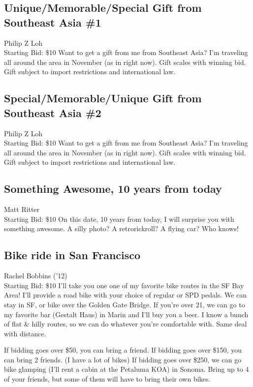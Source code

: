 \documentclass[11pt]{article}
\begin{document}
\subsection{Unique/Memorable/Special Gift from Southeast Asia \#1}
Philip Z Loh
\\
Starting Bid: \$10
\newline
Want to get a gift from me from Southeast Asia? I'm traveling all around the area in November (as in right now). Gift scales with winning bid. Gift subject to import restrictions and international law.
\subsection{Special/Memorable/Unique Gift from Southeast Asia \#2}
Philip Z Loh
\\
Starting Bid: \$10
\newline
Want to get a gift from me from Southeast Asia? I'm traveling all around the area in November (as in right now). Gift scales with winning bid. Gift subject to import restrictions and international law.
\subsection{Something Awesome, 10 years from today}
Matt Ritter
\\
Starting Bid: \$10
\newline
On this date, 10 years from today, I will surprise you with something awesome. A silly photo? A retrorickroll? A flying car? Who knows!
\subsection{Bike ride in San Francisco}
Rachel Bobbins ('12)
\\
Starting Bid: \$10
\newline
I'll take you one one of my favorite bike routes in the SF Bay Area! I'll provide a road bike with your choice of regular or SPD pedals. We can stay in SF, or bike over the Golden Gate Bridge. If you're over 21, we can go to my favorite bar (Gestalt Haus) in Marin and I'll buy you a beer. I know a bunch of flat \& hilly routes, so we can do whatever you're comfortable with. Same deal with distance.

If bidding goes over \$50, you can bring a friend. 
If bidding goes over \$150, you can bring 2 friends. (I have a lot of bikes)
If bidding goes over \$250, we can go bike glamping (I'll rent a cabin at the Petaluma KOA) in Sonoma. Bring up to 4 of your friends, but some of them will have to bring their own bikes.
\end{document}
